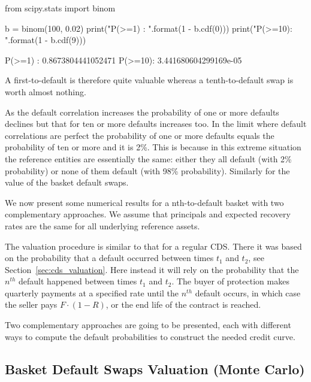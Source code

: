 \begin{ipython}
from scipy.stats import binom

b = binom(100, 0.02)
print("P(>=1) : {}".format(1 - b.cdf(0)))
print("P(>=10): {}".format(1 - b.cdf(9)))
\end{ipython}
\begin{ioutput}
P(>=1) : 0.8673804441052471
P(>=10): 3.441680604299169e-05
\end{ioutput}

A first-to-default is therefore quite valuable whereas a tenth-to-default swap is worth almost nothing.

As the default correlation increases the probability of one or more defaults declines but that for ten or more defaults increases too. In the limit where default correlations are perfect the probability of one or more defaults equals the probability of ten or more and it is 2\%. This is because in this extreme situation the reference entities are essentially the same: either they all default (with 2\% probability) or none of them default (with 98\% probability). Similarly for the value of the basket default swaps.

We now present some numerical results for a nth-to-default basket with two complementary approaches. We assume that principals and expected recovery rates are the same for all underlying reference assets. 

The valuation procedure is similar to that for a regular CDS. There it was based on the probability that a default occurred between times $t_1$ and $t_2$, see Section~\ref{sec:cds_valuation}. Here instead it will rely on the probability that the $n^{th}$ default happened between times $t_1$ and $t_2$. The buyer of protection makes quarterly payments at a specified rate until the $n^{th}$ default occurs, in which case the seller pays $F\cdot(1-R)$, or the end life of the contract is reached. 

Two complementary approaches are going to be presented, each with different ways to compute the default probabilities to construct the needed credit curve.

\subsection{Basket Default Swaps Valuation (Monte Carlo)}
\label{basket-cds-valuation-with-monte-carlo}

